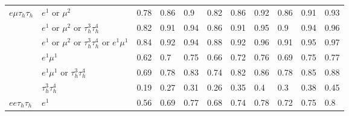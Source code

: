 \begin{table}
{\begin{tabular}{|c|c|c||lllllllll}
\hline
\multicolumn{1}{|l|}{$e\mu\tau_{h}\tau_{h}$} & \multicolumn{2}{l||}{$e^{1}$ or $\mu^{2}$} & \multicolumn{1}{l|}{0.78} & \multicolumn{1}{l|}{0.86} & \multicolumn{1}{l|}{0.9} & \multicolumn{1}{l|}{0.82} & \multicolumn{1}{l|}{0.86} & \multicolumn{1}{l|}{0.92} & \multicolumn{1}{l|}{0.86} & \multicolumn{1}{l|}{0.91} & \multicolumn{1}{l|}{0.93} \\
\multicolumn{1}{|l|}{} & \multicolumn{2}{l||}{$e^{1}$ or $\mu^{2}$ or $\tau_{h}^{3}\tau_{h}^{4}$} & \multicolumn{1}{l|}{0.82} & \multicolumn{1}{l|}{0.91} & \multicolumn{1}{l|}{0.94} & \multicolumn{1}{l|}{0.86} & \multicolumn{1}{l|}{0.91} & \multicolumn{1}{l|}{0.95} & \multicolumn{1}{l|}{0.9} & \multicolumn{1}{l|}{0.94} & \multicolumn{1}{l|}{0.96} \\
\multicolumn{1}{|l|}{} & \multicolumn{2}{l||}{$e^{1}$ or $\mu^{2}$ or $\tau_{h}^{3}\tau_{h}^{4}$ or $e^{1}\mu^{1}$} & \multicolumn{1}{l|}{0.84} & \multicolumn{1}{l|}{0.92} & \multicolumn{1}{l|}{0.94} & \multicolumn{1}{l|}{0.88} & \multicolumn{1}{l|}{0.92} & \multicolumn{1}{l|}{0.96} & \multicolumn{1}{l|}{0.91} & \multicolumn{1}{l|}{0.95} & \multicolumn{1}{l|}{0.97} \\
\multicolumn{1}{|l|}{} & \multicolumn{2}{l||}{$e^{1}\mu^{1}$} & \multicolumn{1}{l|}{0.62} & \multicolumn{1}{l|}{0.7} & \multicolumn{1}{l|}{0.75} & \multicolumn{1}{l|}{0.66} & \multicolumn{1}{l|}{0.72} & \multicolumn{1}{l|}{0.76} & \multicolumn{1}{l|}{0.69} & \multicolumn{1}{l|}{0.75} & \multicolumn{1}{l|}{0.77} \\
\multicolumn{1}{|l|}{} & \multicolumn{2}{l||}{$e^{1}\mu^{1}$ or $\tau_{h}^{3}\tau_{h}^{4}$} & \multicolumn{1}{l|}{0.69} & \multicolumn{1}{l|}{0.78} & \multicolumn{1}{l|}{0.83} & \multicolumn{1}{l|}{0.74} & \multicolumn{1}{l|}{0.82} & \multicolumn{1}{l|}{0.86} & \multicolumn{1}{l|}{0.78} & \multicolumn{1}{l|}{0.85} & \multicolumn{1}{l|}{0.88} \\
\multicolumn{1}{|l|}{} & \multicolumn{2}{l||}{$\tau_{h}^{3}\tau_{h}^{4}$} & \multicolumn{1}{l|}{0.19} & \multicolumn{1}{l|}{0.27} & \multicolumn{1}{l|}{0.31} & \multicolumn{1}{l|}{0.26} & \multicolumn{1}{l|}{0.35} & \multicolumn{1}{l|}{0.4} & \multicolumn{1}{l|}{0.3} & \multicolumn{1}{l|}{0.38} & \multicolumn{1}{l|}{0.45} \\
\hline
\multicolumn{1}{|l|}{$ee\tau_{h}\tau_{h}$} & \multicolumn{2}{l||}{$e^{1}$} & \multicolumn{1}{l|}{0.56} & \multicolumn{1}{l|}{0.69} & \multicolumn{1}{l|}{0.77} & \multicolumn{1}{l|}{0.68} & \multicolumn{1}{l|}{0.74} & \multicolumn{1}{l|}{0.78} & \multicolumn{1}{l|}{0.72} & \multicolumn{1}{l|}{0.75} & \multicolumn{1}{l|}{0.8} \\

\end{tabular}}
\end{table}
